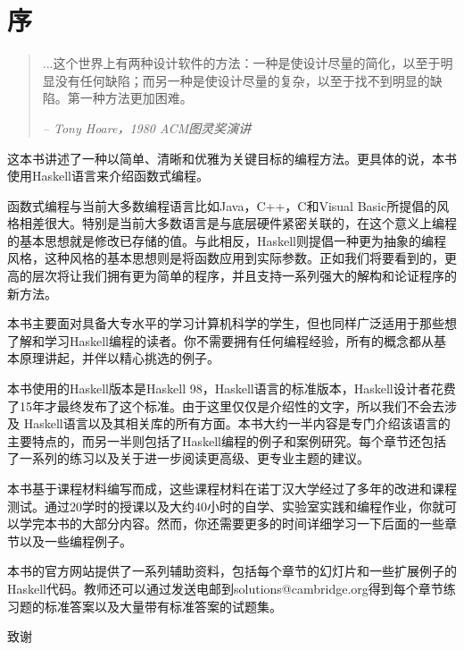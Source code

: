 
\chapter*{序}
\begin{quotation}
...这个世界上有两种设计软件的方法：一种是使设计尽量的简化，以至于明显没有任何缺陷；而另一种是使设计尽量的复杂，以至于找不到明显的缺陷。第一种方法更加困难。
\begin{flushright}
\textit{ -- Tony Hoare，1980 ACM图灵奖演讲}                 %
\end{flushright}
\end{quotation}
这本书讲述了一种以简单、清晰和优雅为关键目标的编程方法。更具体的说，本书使用Haskell语言来介绍函数式编程。

函数式编程与当前大多数编程语言比如Java，C++，C和Visual
Basic所提倡的风格相差很大。特别是当前大多数语言是与底层硬件紧密关联的，在这个意义上编程的基本思想就是修改已存储的值。与此相反，Haskell则提倡一种更为抽象的编程风格，这种风格的基本思想则是将函数应用到实际参数。正如我们将要看到的，更高的层次将让我们拥有更为简单的程序，并且支持一系列强大的解构和论证程序的新方法。

本书主要面对具备大专水平的学习计算机科学的学生，但也同样广泛适用于那些想了解和学习Haskell编程的读者。你不需要拥有任何编程经验，所有的概念都从基本原理讲起，并伴以精心挑选的例子。

本书使用的Haskell版本是Haskell 98，Haskell语言的标准版本，Haskell设计者花费了15年才最终发布了这个标准。由于这里仅仅是介绍性的文字，所以我们不会去涉及
Haskell语言以及其相关库的所有方面。本书大约一半内容是专门介绍该语言的主要特点的，而另一半则包括了Haskell编程的例子和案例研究。每个章节还包括了一系列的练习以及关于进一步阅读更高级、更专业主题的建议。

本书基于课程材料编写而成，这些课程材料在诺丁汉大学经过了多年的改进和课程测试。通过20学时的授课以及大约40小时的自学、实验室实践和编程作业，你就可以学完本书的大部分内容。然而，你还需要更多的时间详细学习一下后面的一些章节以及一些编程例子。

本书的官方网站提供了一系列辅助资料，包括每个章节的幻灯片和一些扩展例子的Haskell代码。教师还可以通过发送电邮到solutions@cambridge.org得到每个章节练习题的标准答案以及大量带有标准答案的试题集。

\begin{flushleft}
致谢\\
\end{flushleft}

